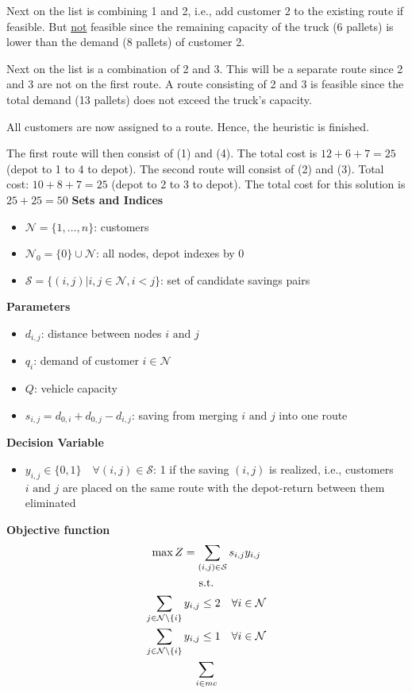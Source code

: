 \documentclass[10pt]{article}
\begin{document}
Next on the list is combining 1 and 2, i.e., add customer 2 to the existing route if feasible. But \underline{not} feasible since the remaining capacity of the truck (6 pallets) is lower than the demand (8 pallets) of customer 2. 

Next on the list is a combination of 2 and 3. This will be a separate route since 2 and 3 are not on the first route. A route consisting of 2 and 3 is feasible since the total demand (13 pallets) does not exceed the truck's capacity. 

All customers are now assigned to a route. Hence, the heuristic is finished. 

The first route will then consist of (1) and (4). The total cost is $12 + 6 + 7 = 25 $ (depot to 1 to 4 to depot). The second route will consist of (2) and (3). Total cost: $10 + 8 + 7 = 25 $ (depot to 2 to 3 to depot). The total cost for this solution is $25 + 25 = 50 $
\newpage 
\textbf{Sets and Indices}
\begin{itemize}
    \item $\mathcal{N} = \{1,\dots, n\} $: customers 
    \item $\mathcal{N}_0 = \{0\}\cup \mathcal{N} $: all nodes, depot indexes by 0
    \item $\mathcal{S} = \{(i, j) | i, j \in \mathcal{N}, i < j\} $: set of candidate savings pairs 
\end{itemize}
\textbf{Parameters}
\begin{itemize}
    \item $d_{i, j} $: distance between nodes $i \text{ and } j $
    \item $q_i $: demand of customer $i\in \mathcal{N} $
    \item $Q $: vehicle capacity
    \item $s_{i, j} = d_{0, i} + d_{0, j} - d_{i, j} $: saving from merging $i \text{ and } j $ into one route 
\end{itemize}
\textbf{Decision Variable}
\begin{itemize}
    \item $y_{i, j}\in \{0, 1\}\quad\forall (i, j)\in \mathcal{S} $: 1 if the saving $(i, j) $ is realized, i.e., customers $i \text{ and } j $ are placed on the same route with the depot-return between them eliminated 
\end{itemize}
\textbf{Objective function}
\begin{gather}
    \max Z = \sum_{(i, j)\in \mathcal{S}}s_{i, j}y_{i, j}\notag\\
    \text{s.t.}\notag \\
    \sum_{j\in \mathcal{N}\setminus \{i\}}y_{i, j}\le 2\quad\forall i\in \mathcal{N}\\
    \sum_{j\in \mathcal{N}\setminus \{i\}}y_{i, j}\le 1\quad\forall i\in \mathcal{N}\\
    \sum_{i\in mc}
\end{gather}
\end{document}
